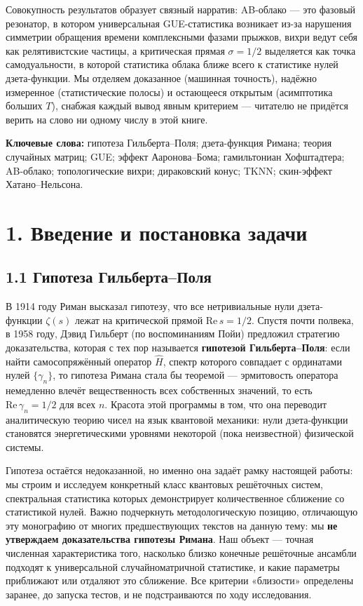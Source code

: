\documentclass[
]{article}
\begin{document}
Совокупность результатов образует связный нарратив: AB-облако --- это
фазовый резонатор, в котором универсальная GUE-статистика возникает
из-за нарушения симметрии обращения времени комплексными фазами прыжков,
вихри ведут себя как релятивистские частицы, а критическая прямая
\(\sigma=1/2\) выделяется как точка самодуальности, в которой статистика
облака ближе всего к статистике нулей дзета-функции. Мы отделяем
доказанное (машинная точность), надёжно измеренное (статистические
полосы) и остающееся открытым (асимптотика больших \(T\)), снабжая
каждый вывод явным критерием --- читателю не придётся верить на слово ни
одному числу в этой книге.

\textbf{Ключевые слова:} гипотеза Гильберта--Поля; дзета-функция Римана;
теория случайных матриц; GUE; эффект Ааронова--Бома; гамильтониан
Хофштадтера; AB-облако; топологические вихри; дираковский конус; TKNN;
скин-эффект Хатано--Нельсона.

\section{1. Введение и постановка
задачи}\label{ux432ux432ux435ux434ux435ux43dux438ux435-ux438-ux43fux43eux441ux442ux430ux43dux43eux432ux43aux430-ux437ux430ux434ux430ux447ux438}

\subsection{1.1 Гипотеза
Гильберта--Поля}\label{ux433ux438ux43fux43eux442ux435ux437ux430-ux433ux438ux43bux44cux431ux435ux440ux442ux430ux43fux43eux43bux44f}

В 1914 году Риман высказал гипотезу, что все нетривиальные нули
дзета-функции \(\zeta(s)\) лежат на критической прямой
\(\mathrm{Re}\,s = 1/2\). Спустя почти полвека, в 1958 году, Дэвид
Гильберт (по воспоминаниям Пойи) предложил стратегию доказательства,
которая с тех пор называется \textbf{гипотезой Гильберта--Поля}: если
найти самосопряжённый оператор \(\hat H\), спектр которого совпадает с
ординатами нулей \(\{\gamma_n\}\), то гипотеза Римана стала бы теоремой
--- эрмитовость оператора немедленно влечёт вещественность всех
собственных значений, то есть \(\mathrm{Re}\,\gamma_n = 1/2\) для всех
\(n\). Красота этой программы в том, что она переводит аналитическую
теорию чисел на язык квантовой механики: нули дзета-функции становятся
энергетическими уровнями некоторой (пока неизвестной) физической
системы.

Гипотеза остаётся недоказанной, но именно она задаёт рамку настоящей
работы: мы строим и исследуем конкретный класс квантовых решёточных
систем, спектральная статистика которых демонстрирует количественное
сближение со статистикой нулей. Важно подчеркнуть методологическую
позицию, отличающую эту монографию от многих предшествующих текстов на
данную тему: мы \textbf{не утверждаем доказательства гипотезы Римана}.
Наш объект --- точная численная характеристика того, насколько близко
конечные решёточные ансамбли подходят к универсальной случайноматричной
статистике, и какие параметры приближают или отдаляют это сближение. Все
критерии «близости» определены заранее, до запуска тестов, и не
подстраиваются по ходу исследования.
\end{document}
